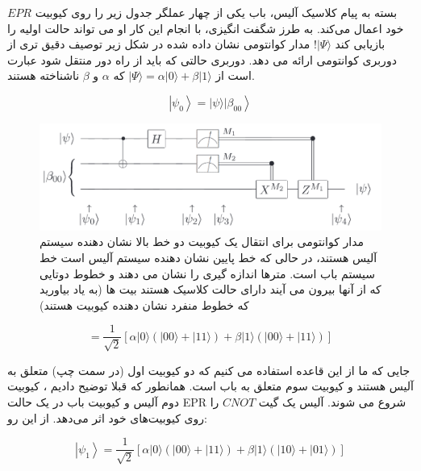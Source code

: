 \documentclass{book}
\begin{document}
 بسته به پیام کلاسیک آلیس، باب یکی از چهار عملگر جدول زیر را روی کیوبیت $EPR$ خود اعمال می‌کند.
 به طرز شگفت انگیزی، با انجام این کار او می تواند حالت اولیه را بازیابی کند $\vert \Psi \rangle$! مدار کوانتومی نشان داده شده در شکل زیر توصیف دقیق تری از دوربری کوانتومی ارائه می دهد.
دوربری حالتی که باید از راه دور منتقل شود عبارت است از $\vert \Psi \rangle = \alpha \vert 0 \rangle + \beta \vert 1 \rangle$ که $\alpha$ و $\beta$ ناشناخته هستند.

\begin{center}
	\begin{equation}\label{psi before spooky action}
		\left.\left|\psi_0\right\rangle=\vert \psi\rangle \vert \beta_{00}\right\rangle
	\end{equation}
\end{center}


\begin{figure}[h]
\centering
\includegraphics[width=6in]{spooky action.png}
\caption{مدار کوانتومی برای انتقال یک کیوبیت دو خط بالا نشان دهنده سیستم آلیس هستند، در حالی که خط پایین نشان دهنده سیستم آلیس است		خط سیستم باب است. مترها اندازه گیری را نشان می دهند و خطوط دوتایی که از آنها بیرون می آیند دارای حالت کلاسیک هستند
		بیت ها (به یاد بیاورید که خطوط منفرد نشان دهنده کیوبیت هستند)}
\end{figure}

\begin{center}
	\begin{equation}\label{wide version spooky psi}
		=\frac{1}{\sqrt{2}}[\alpha|0\rangle(|00\rangle+|11\rangle)+\beta|1\rangle(|00\rangle+|11\rangle)]
	\end{equation}
\end{center}

جایی که ما از این قاعده استفاده می کنیم که دو کیوبیت اول (در سمت چپ) متعلق به آلیس هستند و
کیوبیت سوم متعلق به باب است. همانطور که قبلا توضیح دادیم ، کیوبیت دوم آلیس و کیوبیت باب
در یک حالت EPR شروع می شوند. آلیس یک گیت $CNOT$ را روی کیوبیت‌های خود اثر می‌دهد. از این رو:


\begin{center}
	\begin{equation}\label{Teleport psi1}
		\left|\psi_1\right\rangle=\frac{1}{\sqrt{2}}[\alpha|0\rangle(|00\rangle+|11\rangle)+\beta|1\rangle(|10\rangle+|01\rangle)]
	\end{equation}
\end{center}
\end{document}
